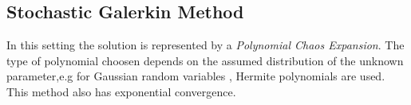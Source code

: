 \subsection{Stochastic Galerkin Method}
In this setting the solution is represented by a \textit{Polynomial Chaos Expansion}. The type of polynomial choosen depends on the assumed distribution of the unknown parameter,e.g for Gaussian random variables , Hermite polynomials are
used. This method also has exponential convergence.

